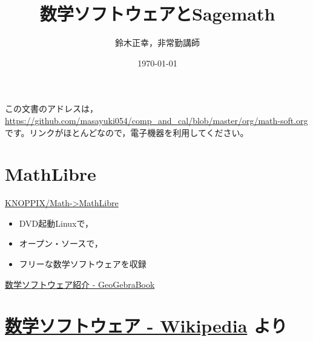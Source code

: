\documentclass[dvipdfmx,11pt]{jarticle}
\author{鈴木正幸，非常勤講師}
\date{\today}
\title{数学ソフトウェアとSagemath}
\begin{document}
\maketitle
この文書のアドレスは，
\url{https://github.com/masayuki054/comp\_and\_cal/blob/master/org/math-soft.org}
です。リンクがほとんどなので，電子機器を利用してください。

\section{MathLibre}
\label{sec:org7a5f3fc}

\href{https://www.geogebra.org/m/hShSTr6e}{KNOPPIX/Math->MathLibre} 

\begin{itemize}
\item DVD起動Linuxで，

\item オープン・ソースで，

\item フリーな数学ソフトウェアを収録
\end{itemize}

\href{https://www.geogebra.org/m/hShSTr6e}{数学ソフトウェア紹介 - GeoGebraBook}


\section{\href{https://ja.wikipedia.org/wiki/\%E6\%95\%B0\%E5\%AD\%A6\%E3\%82\%BD\%E3\%83\%95\%E3\%83\%88\%E3\%82\%A6\%E3\%82\%A7\%E3\%82\%A2}{数学ソフトウェア - Wikipedia} より}
\label{sec:org960c689}
\end{document}
